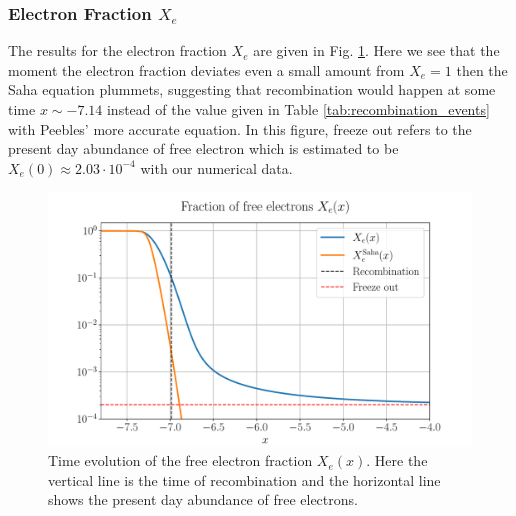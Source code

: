 \documentclass[%
reprint,
 amsmath,amssymb,
 aps,
]{revtex4-2}
\begin{document}
\subsubsection{Electron Fraction $X_e$}
The results for the electron fraction $X_e$ are given in Fig. \ref{fig:Xe}. Here we see that the moment the electron fraction deviates even a small amount from $X_e=1$ then the Saha equation plummets, suggesting that recombination would happen at some time $x\sim-7.14$ instead of the value given in Table \ref{tab:recombination_events} with Peebles' more accurate equation. In this figure, freeze out refers to the present day abundance of free electron which is estimated to be $X_e(0)\approx2.03\cdot10^{-4}$ with our numerical data. 
\begin{figure}[ht!]
\includegraphics[width = \linewidth]{Figures/Xe.pdf}
\caption{Time evolution of the free electron fraction $X_e(x)$. Here the vertical line is the time of recombination and the horizontal line shows the present day abundance of free electrons.}
\label{fig:Xe}
\end{figure}
\end{document}
